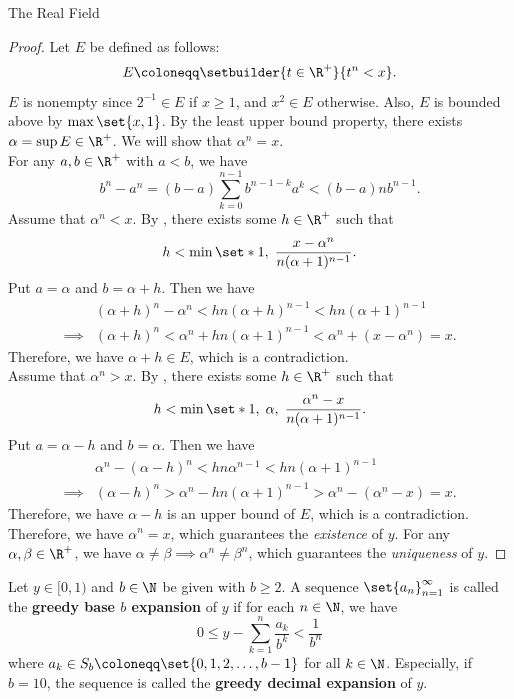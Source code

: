 \begin{section}{The Real Field}
\begin{proof}
    Let $E$ be defined as follows:
    \[
    E \coloneqq \setbuilder{t \in \R^{+}}{t^{n} < x}.
    \]
    $E$ is nonempty since $2^{-1} \in E$ if $x\geq 1$, and $x^{2} \in E$ otherwise.
    Also, $E$ is bounded above by $\max\set{x, 1}$. By the least upper bound property,
    there exists $\alpha = \sup E \in \R^{+}$. We will show that $\alpha^{n} = x$.
    \\[6mm]
    For any $a, b \in \R^{+}$ with $a < b$, we have
    \[
    b^{n} - a^{n} = (b - a)\sum_{k = 0}^{n - 1} b^{n - 1 - k} a^{k} < (b - a)nb^{n - 1}.
    \]
    Assume that $\alpha^{n} < x$. By , there exists some $h \in \R^{+}$ such that
    \[
    h < \min\set*{1, \; \frac{x - \alpha^{n}}{n(\alpha + 1)^{n - 1}}}.
    \]
    Put $a = \alpha$ and $b = \alpha + h$. Then we have
    \begin{align*}
        &(\alpha + h)^{n} - \alpha^{n} < hn(\alpha + h)^{n - 1} < hn(\alpha + 1)^{n - 1} \\
        \implies &(\alpha + h)^{n} < \alpha^{n} + hn(\alpha + 1)^{n - 1} < \alpha^{n} + (x - \alpha^{n}) = x.
    \end{align*}
    Therefore, we have $\alpha + h \in E$, which is a contradiction.
    \\[6mm]
    Assume that $\alpha^{n} > x$. By , there exists some $h \in \R^{+}$ such that
    \[
    h < \min\set*{1, \; \alpha, \; \frac{\alpha^{n} - x}{n(\alpha + 1)^{n - 1}}}.
    \]
    Put $a = \alpha - h$ and $b = \alpha$. Then we have
    \begin{align*}
        &\alpha^{n} - (\alpha - h)^{n} < hn\alpha^{n - 1} < hn(\alpha + 1)^{n - 1} \\
        \implies &(\alpha - h)^{n} > \alpha^{n} - hn(\alpha + 1)^{n - 1} > \alpha^{n} - (\alpha^{n} - x) = x.
    \end{align*}
    Therefore, we have $\alpha - h$ is an upper bound of $E$, which is a contradiction.
    \\[6mm]
    Therefore, we have $\alpha^{n} = x$, which guarantees the \emph{existence} of $y$. For any $\alpha, \beta \in \R^{+}$,
    we have $\alpha \neq \beta \implies \alpha^{n} \neq \beta^{n}$, which guarantees the \emph{uniqueness} of $y$.
\end{proof}

\bigskip

\begin{definition} \label{def:GreedyBaseExpansionOfRealNumbers}
    Let $y \in [0, 1)$ and $b \in \N$ be given with $b \geq 2$. A sequence $\set{a_{n}}_{n = 1}^{\infty}$
    is called the \textbf{greedy base $b$ expansion} of $y$ if for each $n \in \N$, we have
    \[
    0 \leq y - \sum_{k = 1}^{n} \frac{a_{k}}{b^{k}} < \frac{1}{b^{n}}
    \]
    where $a_{k} \in S_{b} \coloneqq \set{0, 1, 2, \dots, b - 1}$ for all $k \in \N$.
    Especially, if $b = 10$, the sequence is called the \textbf{greedy decimal expansion} of $y$.
\end{definition}


\end{section}
